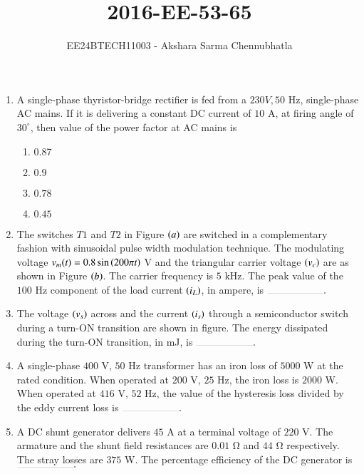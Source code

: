 \documentclass[journal,12pt,onecolumn]{IEEEtran}
\theoremstyle{remark}
\begin{document}

\title{2016-EE-53-65}
\author{EE24BTECH11003 - Akshara Sarma Chennubhatla}
\maketitle
\begin{enumerate}

\item A single-phase thyristor-bridge rectifier is fed from a $230 V, 50$ Hz, single-phase AC mains. If it is delivering a constant DC current of $10$ A, at firing angle of $30^\circ$, then value of the power factor at AC mains is
\begin{enumerate}
\item $0.87$
\item $0.9$
\item $0.78$
\item $0.45$
\end{enumerate}

\item The switches $T1$ and $T2$ in Figure $\left(a\right)$ are switched in a complementary fashion with sinusoidal pulse width modulation technique. The modulating voltage $v_m(t) = 0.8 \sin\left(200\pi t\right)$ V and the triangular carrier voltage $\left(v_c\right)$ are as shown in Figure $\left(b\right)$. The carrier frequency is $5$ kHz. The peak value of the $100$ Hz component of the load current $\left(i_L\right)$, in ampere, is $\rule{2cm}{0.1pt}.$
\begin{center}

\end{center}

\item The voltage $\left(v_s\right)$ across and the current $\left(i_s\right)$ through a semiconductor switch during a turn-ON transition are shown in figure. The energy dissipated during the turn-ON transition, in mJ, is $\rule{2cm}{0.1pt}.$
\begin{center}

\end{center}

\item A single-phase $400$ V, $50$ Hz transformer has an iron loss of $5000$ W at the rated condition. When operated at $200$ V, $25$ Hz, the iron loss is $2000$ W. When operated at $416$ V, $52$ Hz, the value of the hysteresis loss divided by the eddy current loss is $\rule{2cm}{0.1pt}.$

\item A DC shunt generator delivers $45$ A at a terminal voltage of $220$ V. The armature and the shunt field resistances are $0.01$ Ω and $44$ Ω respectively. The stray losses are $375$ W. The percentage efficiency of the DC generator is $\rule{2cm}{0.1pt}.$


\end{enumerate}
\end{document}
